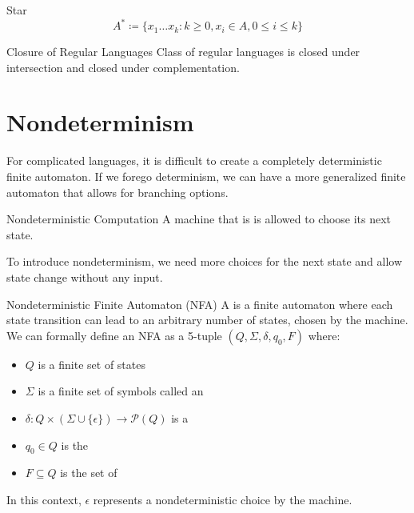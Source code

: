 \documentclass[12pt]{report}
\begin{document}
\begin{dfnbox}{Star}{}
    \[ A^* \coloneq \{ x_1 \ldots x_k : k \geq 0, x_i \in A, 0 \leq i \leq k \} \]
\end{dfnbox}

\begin{thmbox}{Closure of Regular Languages}{}
    Class of regular languages is closed under intersection and closed under complementation.
\end{thmbox}

\section{Nondeterminism}

For complicated languages, it is difficult to create a completely deterministic finite automaton. If we forego determinism, we can have a more generalized finite automaton that allows for branching options.

\begin{dfnbox}{Nondeterministic Computation}{}
    A machine that is  is allowed to choose its next state.
\end{dfnbox}

To introduce nondeterminism, we need more choices for the next state and allow state change without any input.

\begin{dfnbox}{Nondeterministic Finite Automaton (NFA)}{}
    A  is a finite automaton where each state transition can lead to an arbitrary number of states, chosen by the machine.
    \tcblower
    We can formally define an NFA as a 5-tuple $(Q, \Sigma, \delta, q_0, F)$ where:
    \begin{itemize}[noitemsep]
        \item $Q$ is a finite set of states
        \item $\Sigma$ is a finite set of symbols called an 
        \item $\delta : Q \times (\Sigma \cup \{ \epsilon\}) \to \mathcal{P}(Q)$ is a 
        \item $q_0 \in Q$ is the 
        \item $F \subseteq Q$ is the set of 
    \end{itemize}
    In this context, $\epsilon$ represents a nondeterministic choice by the machine.
\end{dfnbox}
\end{document}
